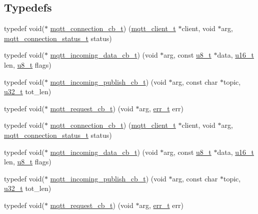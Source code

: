 \subsection*{Typedefs}
\begin{DoxyCompactItemize}
\item 
typedef void($\ast$ \hyperlink{group__mqtt_ga8558743bdb7d599a93844fbc56c9029f}{mqtt\+\_\+connection\+\_\+cb\+\_\+t}) (\hyperlink{structmqtt__client__t}{mqtt\+\_\+client\+\_\+t} $\ast$client, void $\ast$arg, \hyperlink{group__mqtt_ga8cf0f360ab20343af37e1d124395a77d}{mqtt\+\_\+connection\+\_\+status\+\_\+t} status)
\item 
typedef void($\ast$ \hyperlink{group__mqtt_gafec7e75fe6a746eef9ca411463446c81}{mqtt\+\_\+incoming\+\_\+data\+\_\+cb\+\_\+t}) (void $\ast$arg, const \hyperlink{group__compiler__abstraction_ga4caecabca98b43919dd11be1c0d4cd8e}{u8\+\_\+t} $\ast$data, \hyperlink{group__compiler__abstraction_ga77570ac4fcab86864fa1916e55676da2}{u16\+\_\+t} len, \hyperlink{group__compiler__abstraction_ga4caecabca98b43919dd11be1c0d4cd8e}{u8\+\_\+t} flags)
\item 
typedef void($\ast$ \hyperlink{group__mqtt_ga7116bb85255394cec4b1d9fa38842c29}{mqtt\+\_\+incoming\+\_\+publish\+\_\+cb\+\_\+t}) (void $\ast$arg, const char $\ast$topic, \hyperlink{group__compiler__abstraction_ga4c14294869aceba3ef9d4c0c302d0f33}{u32\+\_\+t} tot\+\_\+len)
\item 
typedef void($\ast$ \hyperlink{group__mqtt_gacad2bbe2cee76eaa120cc63e2f6094fd}{mqtt\+\_\+request\+\_\+cb\+\_\+t}) (void $\ast$arg, \hyperlink{group__infrastructure__errors_gaf02d9da80fd66b4f986d2c53d7231ddb}{err\+\_\+t} err)
\item 
typedef void($\ast$ \hyperlink{group__mqtt_ga8558743bdb7d599a93844fbc56c9029f}{mqtt\+\_\+connection\+\_\+cb\+\_\+t}) (\hyperlink{structmqtt__client__t}{mqtt\+\_\+client\+\_\+t} $\ast$client, void $\ast$arg, \hyperlink{group__mqtt_ga8cf0f360ab20343af37e1d124395a77d}{mqtt\+\_\+connection\+\_\+status\+\_\+t} status)
\item 
typedef void($\ast$ \hyperlink{group__mqtt_gafec7e75fe6a746eef9ca411463446c81}{mqtt\+\_\+incoming\+\_\+data\+\_\+cb\+\_\+t}) (void $\ast$arg, const \hyperlink{group__compiler__abstraction_ga4caecabca98b43919dd11be1c0d4cd8e}{u8\+\_\+t} $\ast$data, \hyperlink{group__compiler__abstraction_ga77570ac4fcab86864fa1916e55676da2}{u16\+\_\+t} len, \hyperlink{group__compiler__abstraction_ga4caecabca98b43919dd11be1c0d4cd8e}{u8\+\_\+t} flags)
\item 
typedef void($\ast$ \hyperlink{group__mqtt_ga7116bb85255394cec4b1d9fa38842c29}{mqtt\+\_\+incoming\+\_\+publish\+\_\+cb\+\_\+t}) (void $\ast$arg, const char $\ast$topic, \hyperlink{group__compiler__abstraction_ga4c14294869aceba3ef9d4c0c302d0f33}{u32\+\_\+t} tot\+\_\+len)
\item 
typedef void($\ast$ \hyperlink{group__mqtt_gacad2bbe2cee76eaa120cc63e2f6094fd}{mqtt\+\_\+request\+\_\+cb\+\_\+t}) (void $\ast$arg, \hyperlink{group__infrastructure__errors_gaf02d9da80fd66b4f986d2c53d7231ddb}{err\+\_\+t} err)
\end{DoxyCompactItemize}
